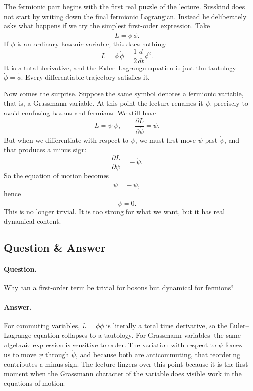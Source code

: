 The fermionic part begins with the first real puzzle of the lecture. Susskind does not start by writing down the final fermionic Lagrangian. Instead he deliberately asks what happens if we try the simplest first-order expression. Take
\begin{equation}
L=\phi\,\dot\phi.
\end{equation}
If \(\phi\) is an ordinary bosonic variable, this does nothing:
\begin{equation}
L=\phi\,\dot\phi=\frac{1}{2}\frac{d}{dt}\phi^2.
\end{equation}
It is a total derivative, and the Euler--Lagrange equation is just the tautology \(\dot\phi=\dot\phi\). Every differentiable trajectory satisfies it.

Now comes the surprise. Suppose the same symbol denotes a fermionic variable, that is, a Grassmann variable. At this point the lecture renames it \(\psi\), precisely to avoid confusing bosons and fermions. We still have
\begin{equation}
L=\psi\,\dot\psi,
\qquad
\frac{\partial L}{\partial \dot\psi}=\psi.
\end{equation}
But when we differentiate with respect to \(\psi\), we must first move \(\psi\) past \(\dot\psi\), and that produces a minus sign:
\begin{equation}
\frac{\partial L}{\partial \psi}=-\,\dot\psi.
\end{equation}
So the equation of motion becomes
\begin{equation}
\dot\psi=-\,\dot\psi,
\end{equation}
hence
\begin{equation}
\dot\psi=0.
\end{equation}
This is no longer trivial. It is too strong for what we want, but it has real dynamical content.

\subsection{Question \& Answer}

\paragraph{Question.} Why can a first-order term be trivial for bosons but dynamical for fermions?

\paragraph{Answer.} For commuting variables, \(L=\phi\dot\phi\) is literally a total time derivative, so the Euler--Lagrange equation collapses to a tautology. For Grassmann variables, the same algebraic expression is sensitive to order. The variation with respect to \(\psi\) forces us to move \(\psi\) through \(\dot\psi\), and because both are anticommuting, that reordering contributes a minus sign. The lecture lingers over this point because it is the first moment when the Grassmann character of the variable does visible work in the equations of motion.

